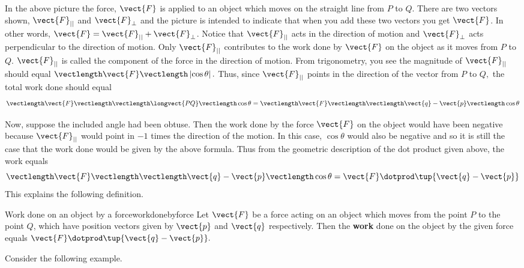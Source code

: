In the above picture the force, $\vect{F}$ is applied to an object which moves
on the straight line from $P$ to $Q.$ There are two vectors shown, $\vect{F}_{||}$ and $\vect{F}_{\bot }$ and the
picture is intended to indicate that when you add these two vectors you get 
$\vect{F}$. In other words, $\vect{F} = \vect{F}_{||} + \vect{F}_{\bot}$. Notice that
 $\vect{F}_{||}$ acts in the direction of motion and 
$\vect{F}_{\bot }$ acts perpendicular to the direction of motion. Only 
$\vect{F}_{||}$ contributes to the work done by $\vect{F}$ on the object
as it moves from $P$ to $Q$. $\vect{F}_{||}$ is
called the component of the force in
 the direction of motion. From trigonometry, you
see the magnitude of $\vect{F}_{||}$ should equal $\vectlength \vect{F}
\vectlength \left| \cos \theta \right| .$ Thus, since $\vect{F}_{||}$ points
in the direction of the vector from $P$ to $Q,$
the total work done should equal
\begin{equation*}
\vectlength \vect{F}\vectlength \vectlength
\longvect{PQ}\vectlength \cos \theta =\vectlength
\vect{F}\vectlength \vectlength \vect{q}-\vect{p}\vectlength \cos \theta
\end{equation*}

Now, suppose the included angle had been obtuse. Then the work done by the force 
$\vect{F}$ on the object would have been negative because $\vect{F}_{||}$
would point in $-1$ times the direction of the motion.  In this case, $\cos \theta $ would also be negative and 
so it is still
the case that the work done would be given by the above formula. Thus from
the geometric description of the dot product given above, the work equals
\begin{equation*}
\vectlength \vect{F}\vectlength \vectlength \vect{q}-\vect{p}\vectlength \cos
\theta =\vect{F}\dotprod \tup{\vect{q}-\vect{p}} 
\end{equation*}
This explains the following definition.

\begin{definition}{Work done on an object by a force}{workdonebyforce}
Let $\vect{F}$ be a force acting on an object which moves from the point 
$P$ to the point $Q$, which have position vectors given by $\vect{p}$ and $\vect{q}$ respectively.
 Then the \textbf{work} done
 on the object by the given force equals $\vect{F}\dotprod \tup{
\vect{q}-\vect{p}} .$
\end{definition}

Consider the following example.

